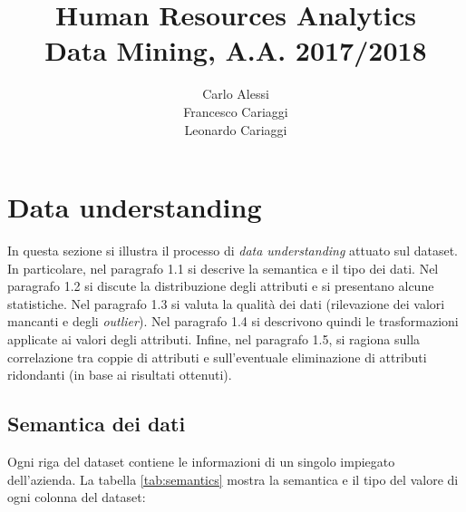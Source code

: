 \documentclass[a4paper]{article}
\title{Human Resources Analytics \\ Data Mining, A.A. 2017/2018}
\author{Carlo Alessi \\ Francesco Cariaggi \\ Leonardo Cariaggi}
\begin{document}
\maketitle
\date{}

\tableofcontents

\newpage

\section{Data understanding}

In questa sezione si illustra il processo di \textit{data understanding} attuato sul dataset. In particolare, nel paragrafo 1.1 si descrive la semantica e il tipo dei dati. Nel paragrafo 1.2 si discute la distribuzione degli attributi e si presentano alcune statistiche. Nel paragrafo 1.3 si valuta la qualità dei dati (rilevazione dei valori mancanti e degli \textit{outlier}). Nel paragrafo 1.4 si descrivono quindi le trasformazioni applicate ai valori degli attributi. Infine, nel paragrafo 1.5, si ragiona sulla correlazione tra coppie di attributi e sull'eventuale eliminazione di attributi ridondanti (in base ai risultati ottenuti).

\subsection{Semantica dei dati}

Ogni riga del dataset contiene le informazioni di un singolo impiegato dell'azienda. La tabella \ref{tab:semantics} mostra la semantica e il tipo del valore di ogni colonna del dataset:
\end{document}
